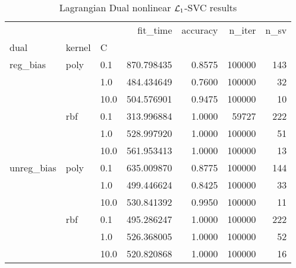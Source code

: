 \begin{table}[H]
\centering
\caption{Lagrangian Dual nonlinear $\protect \mathcal{L}_1$-SVC results}
\label{nonlinear_lagrangian_dual_l1_svc_cv_results}
\begin{tabular}{lllrrrr}
\toprule
           &     &      &    fit\_time &  accuracy &  n\_iter &  n\_sv \\
dual & kernel & C &             &           &         &       \\
\midrule
reg\_bias & poly & 0.1  &  870.798435 &    0.8575 &  100000 &   143 \\
           &     & 1.0  &  484.434649 &    0.7600 &  100000 &    32 \\
           &     & 10.0 &  504.576901 &    0.9475 &  100000 &    10 \\
           & rbf & 0.1  &  313.996884 &    1.0000 &   59727 &   222 \\
           &     & 1.0  &  528.997920 &    1.0000 &  100000 &    51 \\
           &     & 10.0 &  561.953413 &    1.0000 &  100000 &    13 \\
unreg\_bias & poly & 0.1  &  635.009870 &    0.8775 &  100000 &   144 \\
           &     & 1.0  &  499.446624 &    0.8425 &  100000 &    33 \\
           &     & 10.0 &  530.841392 &    0.9950 &  100000 &    11 \\
           & rbf & 0.1  &  495.286247 &    1.0000 &  100000 &   222 \\
           &     & 1.0  &  526.368005 &    1.0000 &  100000 &    52 \\
           &     & 10.0 &  520.820868 &    1.0000 &  100000 &    16 \\
\bottomrule
\end{tabular}
\end{table}
